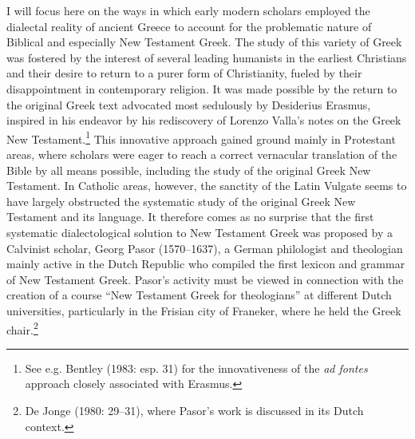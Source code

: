 \begin{styleStandard}
I will focus here on the ways in which early modern scholars employed the dialectal reality of ancient Greece to account for the problematic nature of Biblical and especially New Testament Greek. The study of this variety of Greek was fostered by the interest of several leading humanists in the earliest Christians and their desire to return to a purer form of Christianity, fueled by their disappointment in contemporary religion. It was made possible by the return to the original Greek text advocated most sedulously by Desiderius Erasmus, inspired in his endeavor by his rediscovery of Lorenzo Valla’s notes on the Greek New Testament.\footnote{ See e.g. Bentley (1983: esp. 31) for the innovativeness of the \textit{ad fontes} approach closely associated with Erasmus.} This innovative approach gained ground mainly in Protestant areas, where scholars were eager to reach a correct vernacular translation of the Bible by all means possible, including the study of the original Greek New Testament. In Catholic areas, however, the sanctity of the Latin Vulgate seems to have largely obstructed the systematic study of the original Greek New Testament and its language. It therefore comes as no surprise that the first systematic dialectological solution to New Testament Greek was proposed by a Calvinist scholar, Georg Pasor (1570–1637), a German philologist and theologian mainly active in the Dutch Republic who compiled the first lexicon and grammar of New Testament Greek. Pasor’s activity must be viewed in connection with the creation of a course “New Testament Greek for theologians” at different Dutch universities, particularly in the Frisian city of Franeker, where he held the Greek chair.\footnote{ De Jonge (1980: 29–31), where Pasor’s work is discussed in its Dutch context.}
\end{styleStandard}

